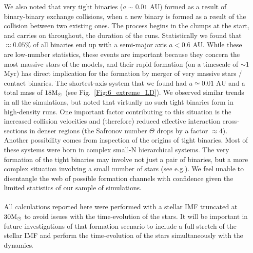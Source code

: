 We also noted that very tight binaries ($a \sim 0.01 $ AU) formed as a result of binary-binary exchange collisions, when a new binary is formed as a result of the collision between two existing ones. The process begins in the clumps at the start, and carries on throughout, the duration of the runs. Statistically we found that $\approx 0.05\%$ of all binaries end up with  a semi-major axis $a < 0.6$ AU. While these are low-number statistics, these events are important because they concern the most massive stars of the models, and their rapid formation (on  a timescale of $\sim 1 $ Myr) has direct implication for the formation by merger of very massive stars / contact binaries. The shortest-axis system that we found had $a \simeq 0.01 $ AU and a total mass of $18{\textrm{M}_\odot}$ (see Fig.~\ref{Fig:6_extreme_LD}).  We observed similar trends in all the simulations, but noted that  virtually no such tight binaries form in high-density runs.  One important factor contributing to this situation is  the increased collision velocities and (therefore) reduced effective interaction cross-sections in denser regions (the Safronov number $\Theta$ drops by a factor $\approx 4$). Another possibility comes from inspection of the origins of tight binaries. Most of these systems were born in complex small-N hierarchical systems. The very formation of the tight binaries may involve not just  a pair of binaries, but a more complex situation involving a small number of stars (see e.g.\citealt{Leigh2013,Geller2015}). We feel unable to disentangle the web of possible formation channels with confidence given the limited statistics of our sample of simulations. 

\paragraph*{}
All  calculations  reported here were performed with a stellar IMF truncated at $30 {\textrm{M}_\odot}$ to avoid issues with the time-evolution of the stars. It will be important in future investigations of that formation scenario to include a full stretch of the stellar IMF and perform the time-evolution of the 
stars simultaneously with the dynamics. 
